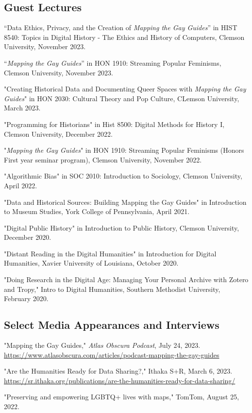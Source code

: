\documentclass[11pt]{article}
\begin{document}
\subsection{Guest Lectures}
``Data Ethics, Privacy, and the Creation of \emph{Mapping the Gay Guides}'' in HIST 8540: Topics in Digital History - The Ethics and History of Computers, Clemson University, November 2023.

``\emph{Mapping the Gay Guides}'' in HON 1910: Streaming Popular Feminisms, Clemson University, November 2023.

"Creating Historical Data and Documenting Queer Spaces with \emph{Mapping the Gay Guides}" in HON 2030: Cultural Theory and Pop Culture, CLemson University, March 2023.

"Programming for Historians" in Hist 8500: Digital Methods for History I, Clemson University, December 2022.

"\emph{Mapping the Gay Guides}" in HON 1910: Streaming Popular Feminisms (Honors First year seminar program), Clemson University, November 2022. 

"Algorithmic Bias" in SOC 2010: Introduction to Sociology, Clemson University, April 2022.

"Data and Historical Sources: Building Mapping the Gay Guides" in Introduction to Museum Studies, York College of Pennsylvania, April 2021.

"Digital Public History" in Introduction to Public History, Clemson University, December 2020.

"Distant Reading in the Digital Humanities" in Introduction for Digital Humanities, Xavier University of Louisiana, October 2020.

"Doing Research in the Digital Age: Managing Your Personal Archive with Zotero and Tropy," Intro to Digital Humanities, Southern Methodist University, February 2020.

\subsection{Select Media Appearances and Interviews}
"Mapping the Gay Guides," \emph{Atlas Obscura Podcast}, July 24, 2023. \url{https://www.atlasobscura.com/articles/podcast-mapping-the-gay-guides}

"Are the Humanities Ready for Data Sharing?," Ithaka S+R, March 6, 2023. \url{https://sr.ithaka.org/publications/are-the-humanities-ready-for-data-sharing/}

"Preserving and empowering LGBTQ+ lives with maps," TomTom, August 25, 2022.
\end{document}
